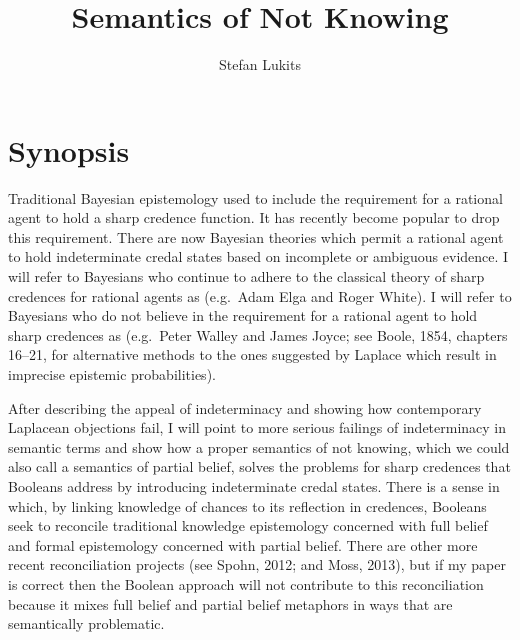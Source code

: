 \documentclass[11pt]{article}
\begin{document}
{}

\title{Semantics of Not Knowing}
\author{Stefan Lukits}
\date{}
\maketitle


\section{Synopsis} 
\label{Synopsis}

Traditional Bayesian epistemology used to include the requirement for
a rational agent to hold a sharp credence function. It has recently
become popular to drop this requirement. There are now Bayesian
theories which permit a rational agent to hold indeterminate credal
states based on incomplete or ambiguous evidence. I will refer to
Bayesians who continue to adhere to the classical theory of sharp
credences for rational agents as  (e.g.\ Adam Elga
and Roger White). I will refer to Bayesians who do not believe in the
requirement for a rational agent to hold sharp credences as
 (e.g.\ Peter Walley and James Joyce; see Boole, 1854,
chapters 16--21, for alternative methods to the ones suggested by
Laplace which result in imprecise epistemic probabilities).

After describing the appeal of indeterminacy and showing how
contemporary Laplacean objections fail, I will point to more serious
failings of indeterminacy in semantic terms and show how a proper
semantics of not knowing, which we could also call a semantics of
partial belief, solves the problems for sharp credences that Booleans
address by introducing indeterminate credal states. There is a sense
in which, by linking knowledge of chances to its reflection in
credences, Booleans seek to reconcile traditional knowledge
epistemology concerned with full belief and formal epistemology
concerned with partial belief. There are other more recent
reconciliation projects (see Spohn, 2012; and Moss, 2013), but if my
paper is correct then the Boolean approach will not contribute to this
reconciliation because it mixes full belief and partial belief
metaphors in ways that are semantically problematic.
\end{document}
